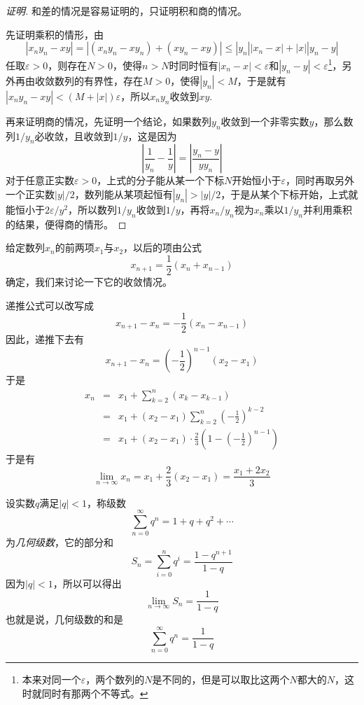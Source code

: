 \begin{proof}[证明]
  和差的情况是容易证明的，只证明积和商的情况。

  先证明乘积的情形，由
  \begin{equation*}
    |x_ny_n-xy| = |(x_ny_n-xy_n) + (xy_n-xy)| \leqslant |y_n||x_n-x| + |x| |y_n-y|
  \end{equation*}
  任取$\varepsilon > 0$，则存在$N>0$，使得$n>N$时同时恒有$|x_n-x|<\varepsilon$和$|y_n-y|<\varepsilon$\footnote{本来对同一个$\varepsilon$，两个数列的$N$是不同的，但是可以取比这两个$N$都大的$N$，这时就同时有那两个不等式。}，另外再由收敛数列的有界性，存在$M>0$，使得$ |y_n| < M$，于是就有 $|x_ny_n-xy| < (M+|x|)\varepsilon$，所以$x_ny_n$收敛到$xy.$

  再来证明商的情况，先证明一个结论，如果数列$y_n$收敛到一个非零实数$y$，那么数列$1/y_n$必收敛，且收敛到$1/y$，这是因为
  \begin{equation*}
    \left| \frac{1}{y_n} - \frac{1}{y} \right| = \left| \frac{y_n-y}{yy_n} \right|
  \end{equation*}
  对于任意正实数$\varepsilon>0$，上式的分子能从某一个下标$N$开始恒小于$\varepsilon$，同时再取另外一个正实数$|y|/2$，数列能从某项起恒有$|y_n|>|y|/2$，于是从某个下标开始，上式就能恒小于$2\varepsilon / y^2$，所以数列$1/y_n$收敛到$1/y$，再将$x_n/y_n$视为$x_n$乘以$1/y_n$并利用乘积的结果，便得商的情形。
\end{proof}


\begin{example}
  给定数列$x_n$的前两项$x_1$与$x_2$，以后的项由公式
  \[ x_{n+1}=\frac{1}{2}(x_n+x_{n-1}) \]
  确定，我们来讨论一下它的收敛情况。

  递推公式可以改写成
  \[ x_{n+1}-x_n = -\frac{1}{2}(x_n-x_{n-1}) \]
  因此，递推下去有
  \[ x_{n+1}-x_n = \left( -\frac{1}{2} \right)^{n-1}(x_2-x_1) \]
  于是
  \begin{eqnarray*}
    x_n & = & x_1 + \sum_{k=2}^n(x_k-x_{k-1})  \\
        & = & x_1 + (x_2-x_1)\sum_{k=2}^n \left( -\frac{1}{2} \right)^{k-2} \\
    & = & x_1 + (x_2-x_1) \cdot \frac{2}{3}\left( 1- \left( - \frac{1}{2} \right)^{n-1} \right)
  \end{eqnarray*}
  于是有
  \[ \lim_{n \to \infty} x_n = x_1 + \frac{2}{3}(x_2-x_1) = \frac{x_1+2x_2}{3} \]
\end{example}

\begin{example}[几何级数]
  设实数$q$满足$|q|<1$，称级数
  \[ \sum_{n=0}^{\infty} q^n = 1+q+q^2+\cdots  \]
  为\emph{几何级数}，它的部分和
  \[ S_n = \sum_{i=0}^n q^i = \frac{1-q^{n+1}}{1-q} \]
  因为$|q|<1$，所以可以得出
  \[ \lim_{n \to \infty} S_n = \frac{1}{1-q} \]
  也就是说，几何级数的和是
  \[ \sum_{n=0}^{\infty} q^n = \frac{1}{1-q} \]
\end{example}

